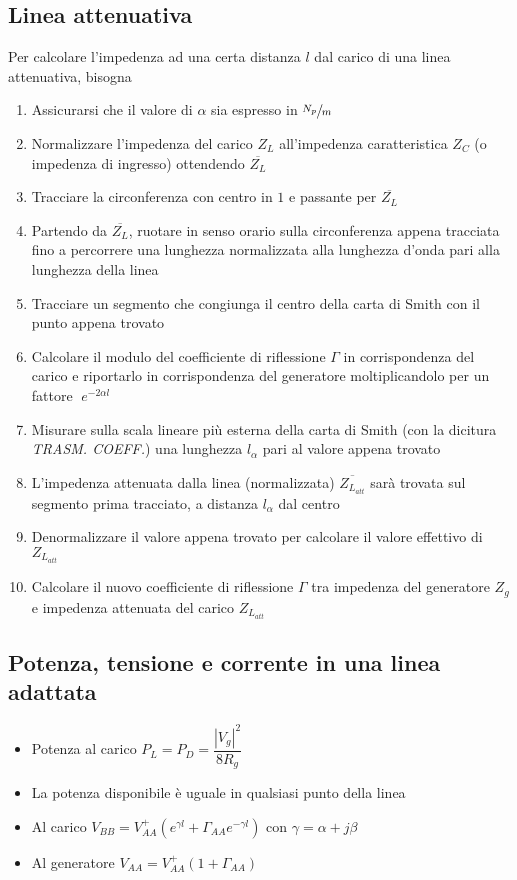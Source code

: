 \documentclass{article}
\begin{document}
\subsection{Linea attenuativa}
Per calcolare l'impedenza ad una certa distanza \(l\) dal carico di una linea attenuativa, bisogna
\begin{enumerate}
	\item Assicurarsi che il valore di \(\alpha\) sia espresso in \(\sfrac{N_p}{m}\)
	\item Normalizzare l'impedenza del carico \(Z_L\) all'impedenza caratteristica \(Z_C\) (o impedenza di ingresso) ottendendo \(\overline{Z_L}\)
	\item Tracciare la circonferenza con centro in \(1\) e passante per \( \overline{Z_L} \)
	\item Partendo da \(\overline{Z_L}\), ruotare in senso orario sulla circonferenza appena tracciata fino a percorrere una lunghezza normalizzata alla lunghezza d'onda pari alla lunghezza della linea
	\item Tracciare un segmento che congiunga il centro della carta di Smith con il punto appena trovato
	\item Calcolare il modulo del coefficiente di riflessione \(\Gamma\) in corrispondenza del carico e riportarlo in corrispondenza del generatore moltiplicandolo per un fattore \(\;e^{-2 \alpha l}\)
	\item Misurare sulla scala lineare più esterna della carta di Smith (con la dicitura \textit{TRASM. COEFF.}) una lunghezza \(l_\alpha\) pari al valore appena trovato
	\item L'impedenza attenuata dalla linea (normalizzata) \(\displaystyle \overline{Z_{L_{att}}}\) sarà trovata sul segmento prima tracciato, a distanza \( l_\alpha\) dal centro
	\item Denormalizzare il valore appena trovato per calcolare il valore effettivo di \( Z_{L_{att}} \)
	\item Calcolare il nuovo coefficiente di riflessione \(\Gamma\) tra impedenza del generatore \(Z_g\) e impedenza attenuata del carico \(Z_{L_{att}}\)
		
\end{enumerate}

\subsection{Potenza, tensione e corrente in una linea adattata}
\begin{itemize}
	\item Potenza al carico \(P_L = P_D = \dfrac{|V_g|^2}{8 R_g} \)
	\item La potenza disponibile è uguale in qualsiasi punto della linea
	\item Al carico \(V_{BB} = V_{AA}^+ \left( e ^ {\gamma l} + \Gamma_{AA} e^{-\gamma l} \right) \) con \(\gamma = \alpha + j \beta \)
	\item Al generatore \( V_{AA} = V_{AA}^+ \left( 1 + \Gamma_{AA} \right) \)
\end{itemize}
\end{document}
